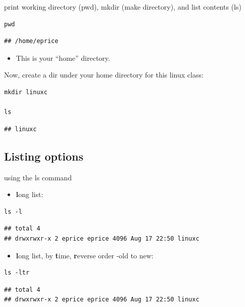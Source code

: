 \documentclass[
]{book}
\providecommand{\tightlist}{%
  \setlength{\itemsep}{0pt}\setlength{\parskip}{0pt}}
\begin{document}
print working directory (pwd), mkdir (make directory), and list contents (ls)

\begin{verbatim}
pwd
\end{verbatim}

\begin{verbatim}
## /home/eprice
\end{verbatim}

\begin{itemize}
\tightlist
\item
  This is your ``home'' directory.
\end{itemize}

Now, create a dir under your home directory for this linux class:

\begin{verbatim}
mkdir linuxc

ls
\end{verbatim}

\begin{verbatim}
## linuxc
\end{verbatim}

\hypertarget{listing-options}{%
\subsection{Listing options}\label{listing-options}}

using the ls command

\begin{itemize}
\tightlist
\item
  \textbf{l}ong list:
\end{itemize}

\begin{verbatim}
ls -l
\end{verbatim}

\begin{verbatim}
## total 4
## drwxrwxr-x 2 eprice eprice 4096 Aug 17 22:50 linuxc
\end{verbatim}

\begin{itemize}
\tightlist
\item
  \textbf{l}ong list, by \textbf{t}ime, \textbf{r}everse order -old to new:
\end{itemize}

\begin{verbatim}
ls -ltr
\end{verbatim}

\begin{verbatim}
## total 4
## drwxrwxr-x 2 eprice eprice 4096 Aug 17 22:50 linuxc
\end{verbatim}
\end{document}
